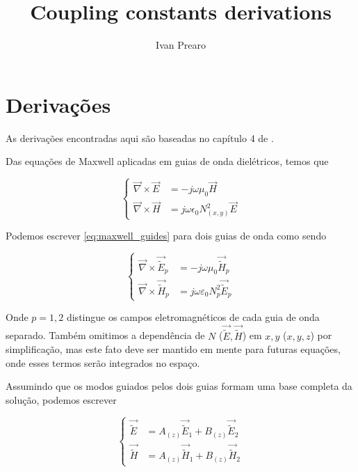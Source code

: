 \documentclass[11pt]{article} %
\title{Coupling constants derivations}
\author{Ivan Prearo}
\newcommand{\diverg}{\vec{\nabla}}
\newcommand{\tildee}{ \vec{\tilde{E}}}
\newcommand{\tildeh}{ \vec{\tilde{H}}}
\newcommand{\epsz}{\varepsilon_0}
\newcommand{\muz}{\mu_0}
\begin{document}
\maketitle

\section{Derivações}

As derivações encontradas aqui são baseadas no capítulo 4 de \cite{okamoto2021fundamentals}.

Das equações de Maxwell aplicadas em guias de onda dielétricos, temos que

\begin{equation}\label{eq:maxwell_guides}
\left\{
\begin{split}
\diverg \times \vec{E} &= -j\omega\mu_0\vec{H} \\
\diverg\times \vec{H} &= j\omega\epsilon_0N_{(x,y)}^2\vec{E}
\end{split}\right.
\end{equation}

Podemos escrever \ref{eq:maxwell_guides} para dois guias de onda como sendo

\begin{equation}\label{eq:maxwell_pguides}
\left\{
\begin{split}
\diverg \times \tildee_p &= -j\omega\muz\tildeh_p \\
\diverg\times \tildeh_p &= j\omega\epsz N_p^2\tildee_p
\end{split}\right.
\end{equation}

Onde $p=1,2$ distingue os campos eletromagnéticos de cada guia de onda separado. Também omitimos a dependência de $N$ ($\tildee,\tildeh$) em $x,y$ ($x,y,z$) por simplificação, mas este fato deve ser mantido em mente para futuras equações, onde esses termos serão integrados no espaço.

Assumindo que os modos guiados pelos dois guias formam uma base completa da solução, podemos escrever

\begin{equation}\label{eq:field_dependancies}
\left\{
\begin{split}
\tildee &= A_{(z)}\tildee_1 + B_{(z)}\tildee_2 \\
\tildeh &= A_{(z)}\tildeh_1 + B_{(z)}\tildeh_2
\end{split}
\right.
\end{equation}
\end{document}
